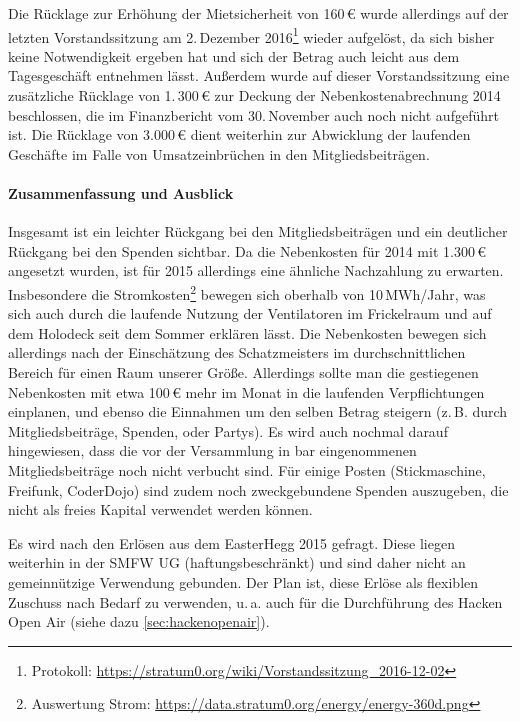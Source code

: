 \documentclass[parskip=half-]{s0minutes}
\begin{document}
Die Rücklage zur Erhöhung der Mietsicherheit von 160\,€ wurde allerdings auf der
letzten Vorstandssitzung am 2.\,Dezember 2016\footnote{Protokoll:
\url{https://stratum0.org/wiki/Vorstandssitzung_2016-12-02}} wieder aufgelöst,
da sich bisher keine Notwendigkeit ergeben hat und sich der Betrag auch leicht
aus dem Tagesgeschäft entnehmen lässt. Außerdem wurde auf dieser
Vorstandssitzung eine zusätzliche Rücklage von 1{.}\,300\,€ zur Deckung der
Nebenkostenabrechnung 2014 beschlossen, die im Finanzbericht vom 30.\,November
auch noch nicht aufgeführt ist. Die Rücklage von 3{.}000\,€ dient weiterhin zur
Abwicklung der laufenden Geschäfte im Falle von Umsatzeinbrüchen in den
Mitgliedsbeiträgen.

\paragraph{Zusammenfassung und Ausblick}
Insgesamt ist ein leichter Rückgang bei den Mitgliedsbeiträgen und ein
deutlicher Rückgang bei den Spenden sichtbar. Da die Nebenkosten für 2014 mit
1{.}300\,€ angesetzt wurden, ist für 2015 allerdings eine ähnliche Nachzahlung zu
erwarten. Insbesondere die Stromkosten\footnote{Auswertung Strom:
\url{https://data.stratum0.org/energy/energy-360d.png}} bewegen sich oberhalb
von 10\,MWh/Jahr, was sich auch durch die laufende Nutzung der Ventilatoren
im Frickelraum und auf dem Holodeck seit dem Sommer erklären lässt. Die
Nebenkosten bewegen sich allerdings nach der Einschätzung des Schatzmeisters im
durchschnittlichen Bereich für einen Raum unserer Größe. Allerdings sollte man
die gestiegenen Nebenkosten mit etwa 100\,€ mehr im Monat in die laufenden
Verpflichtungen einplanen, und ebenso die Einnahmen um den selben Betrag
steigern (z.\,B. durch Mitgliedsbeiträge, Spenden, oder Partys). Es wird auch
nochmal darauf hingewiesen, dass die vor der Versammlung in bar eingenommenen
Mitgliedsbeiträge noch nicht verbucht sind. Für einige Posten (Stickmaschine,
Freifunk, CoderDojo) sind zudem noch zweckgebundene Spenden auszugeben, die
nicht als freies Kapital verwendet werden können.

Es wird nach den Erlösen aus dem EasterHegg 2015 gefragt. Diese liegen weiterhin
in der SMFW UG (haftungsbeschränkt) und sind daher nicht an gemeinnützige
Verwendung gebunden. Der Plan ist, diese Erlöse als flexiblen Zuschuss nach
Bedarf zu verwenden, u.\,a. auch für die Durchführung des Hacken Open Air
(siehe dazu \ref{sec:hackenopenair}).
\end{document}
